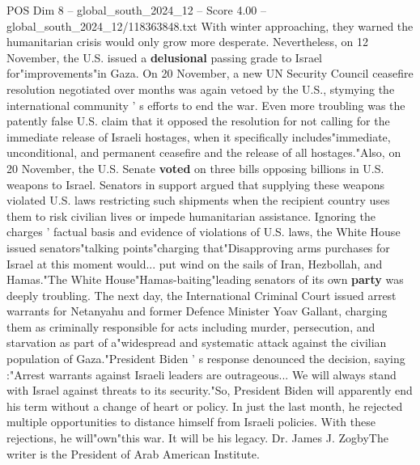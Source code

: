 \begin{textsample}{POS Dim 8 – global\_south\_2024\_12 – Score 4.00 – global\_south\_2024\_12/118363848.txt}
With winter approaching, they warned the humanitarian crisis would only grow more desperate.
Nevertheless, on 12 November, the U.S. issued a \textbf{delusional} passing grade to Israel for"improvements"in Gaza.
On 20 November, a new UN Security Council ceasefire resolution negotiated over months was again vetoed by the U.S., stymying the international community ' s efforts to end the war.
Even more troubling was the patently false U.S. claim that it opposed the resolution for not calling for the immediate release of Israeli hostages, when it specifically includes"immediate, unconditional, and permanent ceasefire and the release of all hostages."Also, on 20 November, the U.S.
Senate \textbf{voted} on three bills opposing billions in U.S. weapons to Israel.
Senators in support argued that supplying these weapons violated U.S. laws restricting such shipments when the recipient country uses them to risk civilian lives or impede humanitarian assistance.
Ignoring the charges ' factual basis and evidence of violations of U.S. laws, the White House issued senators"talking points"charging that"Disapproving arms purchases for Israel at this moment would... put wind on the sails of Iran, Hezbollah, and Hamas."The White House"Hamas-baiting"leading senators of its own \textbf{party} was deeply troubling.
The next day, the International Criminal Court issued arrest warrants for Netanyahu and former Defence Minister Yoav Gallant, charging them as criminally responsible for acts including murder, persecution, and starvation as part of a"widespread and systematic attack against the civilian population of Gaza."President Biden ' s response denounced the decision, saying :"Arrest warrants against Israeli leaders are outrageous...
We will always stand with Israel against threats to its security."So, President Biden will apparently end his term without a change of heart or policy.
In just the last month, he rejected multiple opportunities to distance himself from Israeli policies.
With these rejections, he will"own"this war.
It will be his legacy.
Dr.
James J.
ZogbyThe writer is the President of Arab American Institute.

\end{textsample}
